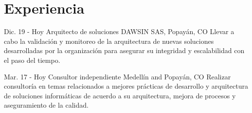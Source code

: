 \documentclass[]{cv-class}
\begin{document}
\section{Experiencia}
\begin{entrylist}
	\entry
	{Dic. 19 - Hoy}
	{Arquitecto de soluciones}
	{DAWSIN SAS, Popayán, CO}
	{\justifying Llevar a cabo la validación y monitoreo de la arquitectura de nuevas soluciones desarrolladas por la organización para asegurar su integridad y escalabilidad con el paso del tiempo.}

	\entry
	{Mar. 17 - Hoy}
	{Consultor independiente}
	{Medellín and Popayán, CO}
	{\justifying Realizar consultoría en temas relacionados a mejores prácticas de desarrollo y arquitectura de soluciones informáticas de acuerdo a su arquitectura, mejora de procesos y aseguramiento de la calidad.}
	  

\end{entrylist}
\end{document}
